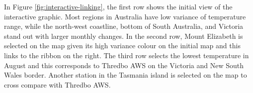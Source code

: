 \documentclass[
]{jss}
\newenvironment{Shaded}{\begin{snugshade}}{\end{snugshade}}
\newcommand{\AttributeTok}[1]{\textcolor[rgb]{0.77,0.63,0.00}{#1}}
\newcommand{\CommentTok}[1]{\textcolor[rgb]{0.56,0.35,0.01}{\textit{#1}}}
\newcommand{\ErrorTok}[1]{\textcolor[rgb]{0.64,0.00,0.00}{\textbf{#1}}}
\newcommand{\FunctionTok}[1]{\textcolor[rgb]{0.00,0.00,0.00}{#1}}
\newcommand{\NormalTok}[1]{#1}
\newcommand{\OtherTok}[1]{\textcolor[rgb]{0.56,0.35,0.01}{#1}}
\newcommand{\SpecialCharTok}[1]{\textcolor[rgb]{0.00,0.00,0.00}{#1}}
\newcommand{\StringTok}[1]{\textcolor[rgb]{0.31,0.60,0.02}{#1}}
\begin{document}
\begin{Shaded}
\end{Shaded}

In Figure \ref{fig:interactive-linking}, the first row shows the initial view of the interactive graphic. Most regions in Australia have low variance of temperature range, while the north-west coastline, bottom of South Australia, and Victoria stand out with larger monthly changes. In the second row, Mount Elizabeth is selected on the map given its high variance colour on the initial map and this links to the ribbon on the right. The third row selects the lowest temperature in August and this corresponds to Thredbo AWS on the Victoria and New South Wales border. Another station in the Tasmania island is selected on the map to cross compare with Thredbo AWS.
\end{document}
